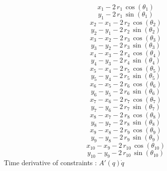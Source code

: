 \[ x_{1} - 2\,r_{1}\,\cos({\theta_{1}}) \]
\[ y_{1} - 2\,r_{1}\,\sin({\theta_{1}}) \]
\[ x_{2} - x_{1} - 2\,r_{2}\,\cos({\theta_{2}}) \]
\[ y_{2} - y_{1} - 2\,r_{2}\,\sin({\theta_{2}}) \]
\[ x_{3} - x_{2} - 2\,r_{3}\,\cos({\theta_{3}}) \]
\[ y_{3} - y_{2} - 2\,r_{3}\,\sin({\theta_{3}}) \]
\[ x_{4} - x_{3} - 2\,r_{4}\,\cos({\theta_{4}}) \]
\[ y_{4} - y_{3} - 2\,r_{4}\,\sin({\theta_{4}}) \]
\[ x_{5} - x_{4} - 2\,r_{5}\,\cos({\theta_{5}}) \]
\[ y_{5} - y_{4} - 2\,r_{5}\,\sin({\theta_{5}}) \]
\[ x_{6} - x_{5} - 2\,r_{6}\,\cos({\theta_{6}}) \]
\[ y_{6} - y_{5} - 2\,r_{6}\,\sin({\theta_{6}}) \]
\[ x_{7} - x_{6} - 2\,r_{7}\,\cos({\theta_{7}}) \]
\[ y_{7} - y_{6} - 2\,r_{7}\,\sin({\theta_{7}}) \]
\[ x_{8} - x_{7} - 2\,r_{8}\,\cos({\theta_{8}}) \]
\[ y_{8} - y_{7} - 2\,r_{8}\,\sin({\theta_{8}}) \]
\[ x_{9} - x_{8} - 2\,r_{9}\,\cos({\theta_{9}}) \]
\[ y_{9} - y_{8} - 2\,r_{9}\,\sin({\theta_{9}}) \]
\[ x_{10} - x_{9} - 2\,r_{10}\,\cos({\theta_{10}}) \]
\[ y_{10} - y_{9} - 2\,r_{10}\,\sin({\theta_{10}}) \]
Time derivative of constraints : $A'(q)\dot{q}$
 
